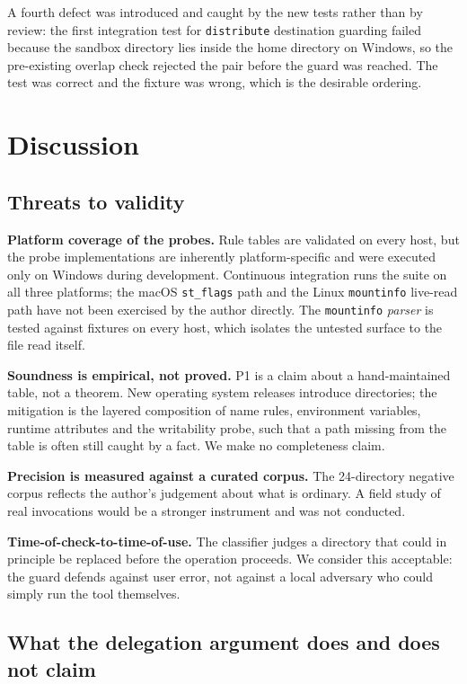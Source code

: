 \documentclass[11pt,a4paper]{article}
\newcommand{\code}[1]{\texttt{\small #1}}
\begin{document}
A fourth defect was introduced and caught by the new tests rather than by review: the
first integration test for \code{distribute} destination guarding failed because the
sandbox directory lies inside the home directory on Windows, so the pre-existing
overlap check rejected the pair before the guard was reached. The test was correct and
the fixture was wrong, which is the desirable ordering.

\section{Discussion}
\label{sec:discussion}

\subsection{Threats to validity}

\textbf{Platform coverage of the probes.} Rule tables are validated on every host, but
the probe implementations are inherently platform-specific and were executed only on
Windows during development. Continuous integration runs the suite on all three
platforms; the macOS \code{st\_flags} path and the Linux \code{mountinfo} live-read
path have not been exercised by the author directly. The \code{mountinfo} \emph{parser}
is tested against fixtures on every host, which isolates the untested surface to the
file read itself.

\textbf{Soundness is empirical, not proved.} P1 is a claim about a hand-maintained
table, not a theorem. New operating system releases introduce directories; the mitigation
is the layered composition of name rules, environment variables, runtime attributes and
the writability probe, such that a path missing from the table is often still caught by
a fact. We make no completeness claim.

\textbf{Precision is measured against a curated corpus.} The 24-directory negative
corpus reflects the author's judgement about what is ordinary. A field study of real
invocations would be a stronger instrument and was not conducted.

\textbf{Time-of-check-to-time-of-use.} The classifier judges a directory that could in
principle be replaced before the operation proceeds. We consider this acceptable: the
guard defends against user error, not against a local adversary who could simply run
the tool themselves.

\subsection{What the delegation argument does and does not claim}
\end{document}
